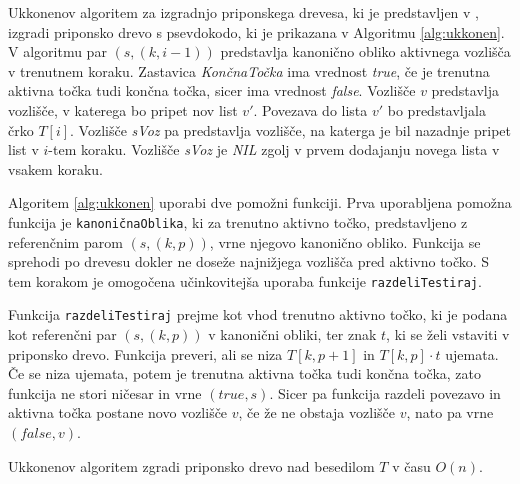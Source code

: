 Ukkonenov algoritem za izgradnjo priponskega drevesa, ki je predstavljen v \cite{Ukkonen1995}, izgradi priponsko drevo s psevdokodo, ki je prikazana v Algoritmu \ref{alg:ukkonen}.
V algoritmu par $(s, (k,i-1))$ predstavlja kanonično obliko aktivnega vozlišča v trenutnem koraku. Zastavica \textit{KončnaTočka} ima vrednost \textit{true}, če je trenutna aktivna točka tudi končna točka, sicer ima vrednost \textit{false}. Vozlišče $v$ predstavlja vozlišče, v katerega bo pripet nov list $v'$. Povezava do lista $v'$ bo predstavljala črko $T[i]$. Vozlišče \textit{sVoz} pa predstavlja vozlišče, na katerga je bil nazadnje pripet list v $i$-tem koraku. Vozlišče \textit{sVoz} je \textit{NIL} zgolj v prvem dodajanju novega lista v vsakem koraku.


Algoritem \ref{alg:ukkonen} uporabi dve pomožni funkciji. Prva uporabljena pomožna funkcija je \texttt{kanoničnaOblika}, ki za trenutno aktivno točko, predstavljeno z referenčnim parom $(s,(k, p))$, vrne njegovo kanonično obliko. Funkcija se sprehodi po drevesu dokler ne doseže najnižjega vozlišča pred aktivno točko. S tem korakom je omogočena učinkovitejša uporaba funkcije \texttt{razdeliTestiraj}.

Funkcija \texttt{razdeliTestiraj} prejme kot vhod trenutno aktivno točko, ki je podana kot referenčni par $(s,(k,p))$ v kanonični obliki, ter znak $t$, ki se želi vstaviti v priponsko drevo. Funkcija preveri, ali se niza $T[k,p+1]$ in $T[k,p]\cdot t$ ujemata. Če se niza ujemata, potem je trenutna aktivna točka tudi končna točka, zato funkcija ne stori ničesar in vrne $(\textit{true},s)$. Sicer pa funkcija razdeli povezavo in aktivna točka postane novo vozlišče $v$, če že ne obstaja vozlišče $v$, nato pa vrne $(\textit{false},v)$. 


\begin{izr} \label{izr:ukkonen}
    Ukkonenov algoritem zgradi priponsko drevo nad besedilom $T$ v času $O(n)$.
\end{izr}


